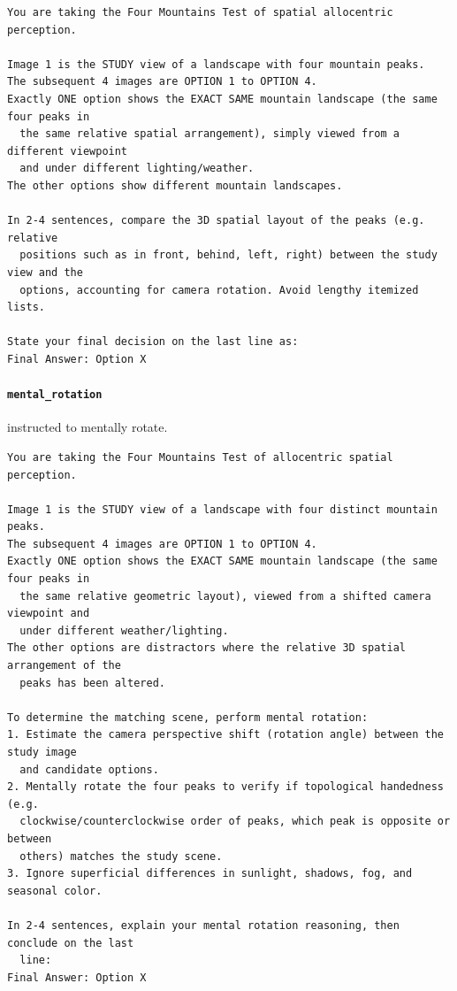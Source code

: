\begin{footnotesize}
\begin{verbatim}
You are taking the Four Mountains Test of spatial allocentric perception.

Image 1 is the STUDY view of a landscape with four mountain peaks.
The subsequent 4 images are OPTION 1 to OPTION 4.
Exactly ONE option shows the EXACT SAME mountain landscape (the same four peaks in
  the same relative spatial arrangement), simply viewed from a different viewpoint
  and under different lighting/weather.
The other options show different mountain landscapes.

In 2-4 sentences, compare the 3D spatial layout of the peaks (e.g. relative
  positions such as in front, behind, left, right) between the study view and the
  options, accounting for camera rotation. Avoid lengthy itemized lists.

State your final decision on the last line as:
Final Answer: Option X
\end{verbatim}
\end{footnotesize}

\paragraph{\texttt{mental\_rotation}} instructed to mentally rotate.

\begin{footnotesize}
\begin{verbatim}
You are taking the Four Mountains Test of allocentric spatial perception.

Image 1 is the STUDY view of a landscape with four distinct mountain peaks.
The subsequent 4 images are OPTION 1 to OPTION 4.
Exactly ONE option shows the EXACT SAME mountain landscape (the same four peaks in
  the same relative geometric layout), viewed from a shifted camera viewpoint and
  under different weather/lighting.
The other options are distractors where the relative 3D spatial arrangement of the
  peaks has been altered.

To determine the matching scene, perform mental rotation:
1. Estimate the camera perspective shift (rotation angle) between the study image
  and candidate options.
2. Mentally rotate the four peaks to verify if topological handedness (e.g.
  clockwise/counterclockwise order of peaks, which peak is opposite or between
  others) matches the study scene.
3. Ignore superficial differences in sunlight, shadows, fog, and seasonal color.

In 2-4 sentences, explain your mental rotation reasoning, then conclude on the last
  line:
Final Answer: Option X
\end{verbatim}
\end{footnotesize}

